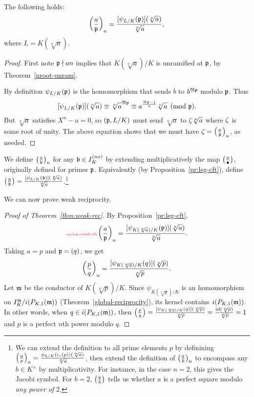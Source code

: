 \begin{pr}
The following holds:
\[
\left( {\frac{a}{\mathfrak{p}}} \right)_n=\frac{[\psi_{L/K}(\mathfrak{p})](\sqrt[n]{a})}{\sqrt[n]a},
\]
where $L=K(\sqrt[n] a)$.
\end{pr}
\begin{proof}
First note $\mathfrak{p} \nmid an$ implies that $K(\sqrt[n]a)/K$ is unramified at $\mathfrak{p}$, by Theorem~\ref{nroot-unram}.

By definition $\psi_{L/K}(\mathfrak{p})$ is the homomorphism that sends $b$ to $b^{\mathfrak N\mathfrak{p}}$ modulo $\mathfrak{p}$. Thus
\[
[\psi_{L/K}(\mathfrak{p})](\sqrt[n]{a})
\equiv \sqrt[n]{a}^{\mathfrak N\mathfrak{p}}\equiv a^{\frac{\mathfrak N\mathfrak{p}-1}{n}}\sqrt[n]{a}\pmod{\mathfrak{p}}.
\]
But $\sqrt[n]{a}$ satisfies $X^n-a=0$, so $(\mathfrak{p},L/K)$ must send $\sqrt[n]{a}$ to $\zeta\sqrt[n]{a}$ where $\zeta$ is some root of unity. The above equation shows that we must have $\zeta=\left( {\frac{a}{\mathfrak{p}}} \right)_n$, as needed.
\end{proof}
We define $\left( {\frac{a}{\mathfrak{b}}} \right)_n$ for any $\mathfrak{b}\in I_K^{(na)}$ by extending multiplicatively the map $\left( {\frac{a}{\bullet}} \right)$, originally defined for primes $\mathfrak{p}$. Equivalently (by Proposition~\ref{pr:leg-cft}), define $\left( {\frac{a}{\mathfrak{b}}} \right)=\frac{[\psi_{L/K}(\mathfrak{b})](\sqrt[n]{a})}{\sqrt[n]a}$.\footnote{We can extend the definition to all prime elements $p$ by definining $\left( {\frac{a}{p}} \right)_n=\frac{\phi_{L/K}(i_v(p))(\sqrt[n]a)}{\sqrt[n]a}$, then extend the definition of $\left( {\frac{a}{b}} \right)_n$ to encompass any $b\in K^{\times}$ by multiplicativity. For instance, in the case $n=2$, this gives the Jacobi symbol. For $b=2$, $\left( {\frac{a}{b}} \right)$ tells us whether $a$ is a perfect square modulo {\it any power of }2.}

We can now prove weak reciprocity.
\begin{proof}[Proof of Theorem~\ref{thm:weak-rec}]
By Proposition~\ref{pr:leg-cft}, 
\begin{equation}\llabel{eq:leg-symb-cft}
\pf{a}{\mfp}_n=\fc{[\psi_{K(\sqrt[n]a)/K}(\mfp)](\sqrt[n]{a})}{\sqrt[n]a}.
\end{equation}
Taking $a=p$ and $\mathfrak{p}=(q)$, we get
\[
\left( {\frac{p}{q}} \right)_n=\frac{[\psi_{K(\sqrt[n]p)/K}(q)](\sqrt[n]{p})}{\sqrt[n]p}.
\]
Let $\mathfrak{m}$ be the conductor of $K(\sqrt[n]p)/K$. 
Since $\psi_{K(\sqrt[n]p)/K}$ is an homomorphism on $I_K^{\mathfrak{m}}/i(P_{K,1}(\mathfrak{m}))$ (Theorem~\ref{global-reciprocity}), its kernel contains $i(P_{K,1}(\mathfrak{m}))$. In other words, when $q\in i(P_{K,1}(\mathfrak{m}))$, then $\left( {\frac{p}{q}} \right)=\frac{[\psi_{K(\sqrt[n]q)/K}(q)](\sqrt[n]{p})}{\sqrt[n]p}=\frac{\mathrm{id}(\sqrt[n]{p})}{\sqrt[n]p}=1$ and $p$ is a perfect $n$th power modulo $q$.
\end{proof}
